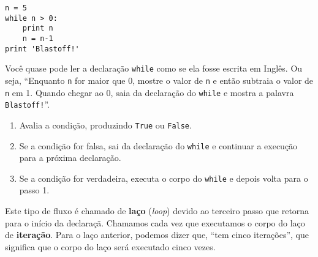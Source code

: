 \beforeverb
\begin{verbatim}
n = 5
while n > 0:
    print n
    n = n-1
print 'Blastoff!'
\end{verbatim}
\afterverb
%

%
Você quase pode ler a declaração {\tt while} como se ela fosse escrita em
Inglês. Ou seja, ``Enquanto {\tt n} for maior que 0, mostre o valor de {\tt n}
e então subtraia o valor de {\tt n} em 1. Quando chegar ao 0, saia da
declaração do {\tt while} e mostra a palavra {\tt Blastoff!}''.



\begin{enumerate}

\item Avalia a condição, produzindo {\tt True} ou {\tt False}.

\item Se a condição for falsa, sai da declaração do {\tt while} e continuar
	a execução para a próxima declaração.

\item Se a condição for verdadeira, executa o corpo do {\tt while} e depois
	volta para o passo 1.

\end{enumerate}


Este tipo de fluxo é chamado de {\bf laço} ({\it loop}) devido ao terceiro
passo que retorna para o início da declaraçã. Chamamos cada vez que executamos
o corpo do laço de {\bf iteração}. Para o laço anterior, podemos dizer que,
``tem cinco iterações'', que significa que o corpo do laço será executado
cinco vezes.


